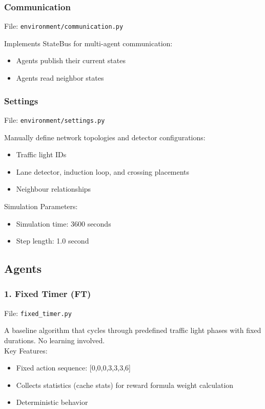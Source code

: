 \documentclass[a4paper]{report}
\begin{document}
\subsubsection{Communication}

File: \texttt{environment/communication.py}

\noindent
Implements StateBus for multi-agent communication:
\begin{itemize}
    \item Agents publish their current states
    \item Agents read neighbor states
\end{itemize}

\subsubsection{Settings}

File: \texttt{environment/settings.py}

\noindent
Manually define network topologies and detector configurations:
\begin{itemize}
    \item Traffic light IDs
    \item Lane detector, induction loop, and crossing placements
    \item Neighbour relationships
\end{itemize}

\noindent
Simulation Parameters:
\begin{itemize}
    \item Simulation time: 3600 seconds
    \item Step length: 1.0 second
\end{itemize}

\subsection{Agents}

\subsubsection{1. Fixed Timer (FT)}

File: \texttt{fixed\_timer.py}

\noindent
A baseline algorithm that cycles through predefined traffic light phases with fixed durations. No learning involved.
\\

\noindent
Key Features:
\begin{itemize}
    \item Fixed action sequence: [0,0,0,3,3,3,6]
    \item Collects statistics (cache stats) for reward formula weight calculation
    \item Deterministic behavior
\end{itemize}
\end{document}
